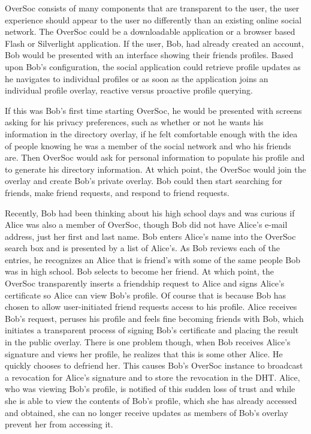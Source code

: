 \documentclass{IEEEtran}
\begin{document}
OverSoc consists of many components that are transparent to the user, the user
experience should appear to the user no differently than an existing online
social network.  The OverSoc could be a downloadable application or a browser
based Flash or Silverlight application.  If the user, Bob, had already created
an account, Bob would be presented with an interface showing their friends
profiles.  Based upon Bob's configuration, the social application could
retrieve profile updates as he navigates to individual profiles or as soon as
the application joins an individual profile overlay, reactive versus proactive
profile querying.  

If this was Bob's first time starting OverSoc, he would be presented with
screens asking for his privacy preferences, such as whether or not he wants his
information in the directory overlay, if he felt comfortable enough with the
idea of people knowing he was a member of the social network and who his
friends are.  Then OverSoc would ask for personal information to populate his
profile and to generate his directory information.  At which point, the OverSoc
would join the overlay and create Bob's private overlay.  Bob could then start
searching for friends, make friend requests, and respond to friend requests.

Recently, Bob had been thinking about his high school days and was curious if
Alice was also a member of OverSoc, though Bob did not have Alice's e-mail
address, just her first and last name.  Bob enters Alice's name into the
OverSoc search box and is presented by a list of Alice's.  As Bob reviews each
of the entries, he recognizes an Alice that is friend's with some of the same
people Bob was in high school.  Bob selects to become her friend.  At which
point, the OverSoc transparently inserts a friendship request to Alice and
signs Alice's certificate so Alice can view Bob's profile.  Of course that is
because Bob has chosen to allow user-initiated friend requests access to his
profile.  Alice receives Bob's request, peruses his profile and feels fine
becoming friends with Bob, which initiates a transparent process of signing
Bob's certificate and placing the result in the public overlay.  There is one
problem though, when Bob receives Alice's signature and views her profile, he
realizes that this is some other Alice.  He quickly chooses to defriend her.
This causes Bob's OverSoc instance to broadcast a revocation for Alice's
signature and to store the revocation in the DHT.  Alice, who was viewing Bob's
profile, is notified of this sudden loss of trust and while she is able to view
the contents of Bob's profile, which she has already accessed and obtained, she
can no longer receive updates as members of Bob's overlay prevent her from
accessing it.
\end{document}
